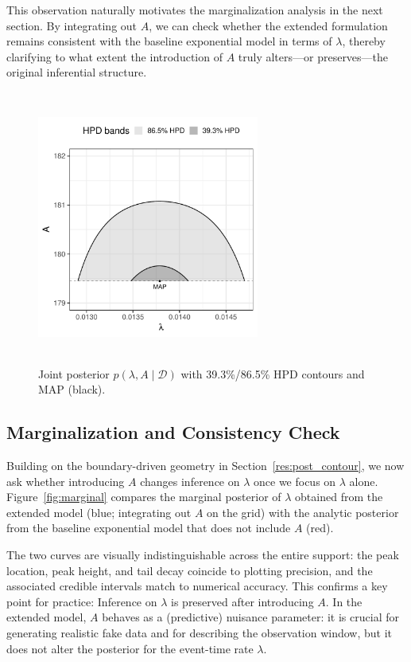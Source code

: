 This observation naturally motivates the marginalization analysis in the next section. By integrating out $A$, we can check whether the extended formulation remains consistent with the baseline exponential model in terms of $\lambda$, thereby clarifying to what extent the introduction of $A$ truly alters—or preserves—the original inferential structure.
\begin{figure}[H]
    \centering
    \includegraphics[height=9cm, width=0.65\textwidth]{images/post_contour.pdf}
    \caption{{\small Joint posterior $p(\lambda,A\mid\mathcal D)$ with 39.3\%/86.5\% HPD contours and MAP (black).}}
    \label{fig:contour}
\end{figure}


\subsection{Marginalization and Consistency Check}
\label{res:marginal}
Building on the boundary-driven geometry in Section~\ref{res:post_contour}, we now ask whether introducing $A$ changes inference on $\lambda$ once we focus on $\lambda$ alone. Figure~\ref{fig:marginal} compares the marginal posterior of $\lambda$ obtained from the extended model (blue; integrating out $A$ on the grid) with the analytic posterior from the baseline exponential model that does not include $A$ (red).

The two curves are visually indistinguishable across the entire support: the peak location, peak height, and tail decay coincide to plotting precision, and the associated credible intervals match to numerical accuracy. This confirms a key point for practice: Inference on $\lambda$ is preserved after introducing $A$. In the extended model, $A$ behaves as a (predictive) nuisance parameter: it is crucial for generating realistic fake data and for describing the observation window, but it does not alter the posterior for the event-time rate $\lambda$.

